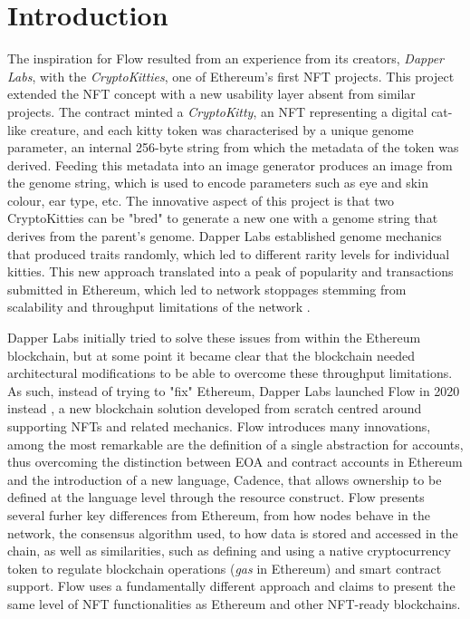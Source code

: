 \documentclass[../NFTComp_IEEE.tex]{subfiles}
\begin{document}
\section{Introduction}
\label{sec:introduction}
The inspiration for Flow resulted from an experience from its creators, \textit{Dapper Labs}, with the \textit{CryptoKitties}, one of Ethereum's first NFT projects. This project extended the NFT concept with a new usability layer absent from similar projects. The contract minted a \textit{CryptoKitty}, an NFT representing a digital cat-like creature, and each kitty token was characterised by a unique genome parameter, an internal 256-byte string from which the metadata of the token was derived. Feeding this metadata into an image generator produces an image from the genome string, which is used to encode parameters such as eye and skin colour, ear type, etc. The innovative aspect of this project is that two CryptoKitties can be "bred" to generate a new one with a genome string that derives from the parent's genome. Dapper Labs established genome mechanics that produced traits randomly, which led to different rarity levels for individual kitties. This new approach translated into a peak of popularity and transactions submitted in Ethereum, which led to network stoppages stemming from scalability and throughput limitations of the network \cite{bbc2017}.
\par
Dapper Labs initially tried to solve these issues from within the Ethereum blockchain, but at some point it became clear that the blockchain needed architectural modifications to be able to overcome these throughput limitations. As such, instead of trying to "fix" Ethereum, Dapper Labs launched Flow in 2020 instead \cite{Gharegozlou2019}, a new blockchain solution developed from scratch centred around supporting NFTs and related mechanics. Flow introduces many innovations, among the most remarkable are the definition of a single abstraction for accounts, thus overcoming the distinction between EOA and contract accounts in Ethereum and the introduction of a new language, Cadence, that allows ownership to be defined at the language level through the resource construct.
Flow presents several furher key differences from Ethereum, from how nodes behave in the network, the consensus algorithm used, to how data is stored and accessed in the chain, as well as similarities, such as defining and using a native cryptocurrency token to regulate blockchain operations (\textit{gas} in Ethereum) and smart contract support. Flow uses a fundamentally different approach and claims to present the same level of NFT functionalities as Ethereum and other NFT-ready blockchains.
\end{document}
